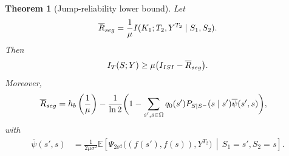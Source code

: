 \documentclass[10pt,a4paper]{amsart}
\newtheorem{theorem}{Theorem}
\begin{document}
\begin{theorem}[Jump-reliability lower bound]
\label{thm:jump_reliability_lower_bound}
Let 
\begin{align}
    \overline{R}_{\rm seg}
    =
    \frac{1}{\mu}
    I(K_1;{T_2},Y^{T_2}\mid S_1,S_2).
\end{align}
Then
\begin{align}\label{eq:LB_eq}
    I_T(S;Y)\ge \mu\bigl(I_{\rm ISI}-\overline{R}_{\rm seg}\bigr).
\end{align}
Moreover,
{\begin{align}
    \overline{R}_{\rm seg}
    &=h_b\left(\frac{1}{\mu}\right)- \frac{1}{\ln 2}
    \biggl( 1-\sum_{s',s\in\Omega} q_0(s')P_{S|S^-}(s\mid s')
    \overline{\psi}(s',s)
    \biggr),
\end{align}}
with
{\begin{align}
    \overline{\psi}(s',s)
    &=
    \frac{1}{2\mu\sigma^2}
    \mathbb{E}\!\left[
        \Psi_{2\sigma^2}\bigl((f(s'),f(s)),Y^{T_2}\bigr)
        \,\middle|\,
        S_1=s',S_2=s
    \right].
\end{align}}
\end{theorem}
\end{document}
